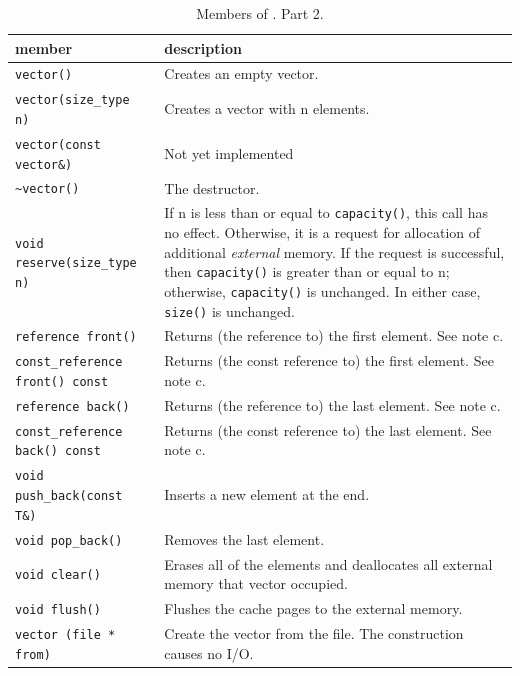 \documentclass[twoside]{book}
\begin{document}
\begin{table}[h]
\begin{center}
\caption{Members of \xvector. Part 2.}
\label{vectormembers2}
\begin{tabular}{|p{6cm}|p{5cm}|}
\hline
member & description  \\
\hline\hline
\texttt{vector()} & Creates an empty vector. \\
\hline
\texttt{vector(size\_type n)} & Creates a vector with n elements. \\
\hline
\texttt{vector(const vector\&)} & Not yet implemented \\
\hline
\texttt{\textasciitilde vector()} & The destructor. \\
\hline
\texttt{void reserve(size\_type n)} & If n is less than or equal to
\texttt{capacity()}, this call has no effect. Otherwise, it is a request for
allocation of additional \emph{external} memory. If the request is successful, then
\texttt{capacity()} is greater than or equal to n; otherwise,
\texttt{capacity()} is 
unchanged. In either case, \texttt{size()} is unchanged. \\
\hline
\texttt{reference front()} & Returns (the reference to) the first
element. See note c.\\
\hline
\texttt{const\_reference front() const} & Returns (the const reference to)
the first element. See note c.\\ 
\hline
\texttt{reference back()} & Returns (the reference to) the last
element. See note c.\\
\hline
\texttt{const\_reference back() const} & Returns (the const reference to)
the last element. See note c.\\ 
\hline
\texttt{void push\_back(const T\&)} & Inserts a new element at the
end. \\
\hline
\texttt{void pop\_back()} & Removes the last element. \\
\hline
\texttt{void clear()} & Erases all of the elements and deallocates all
external memory that vector occupied.\\
\hline
\texttt{void flush()} & Flushes the cache pages to the external
memory. \\
\hline
\texttt{vector (file * from)} & Create the vector from the
file. The construction causes no I/O.\\
\hline
\end{tabular}
\end{center}
\end{table}
\end{document}
